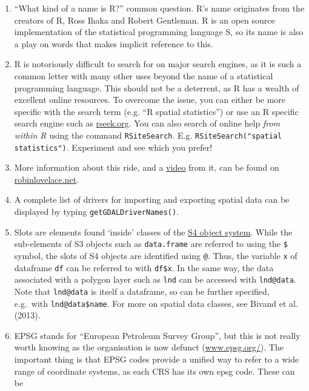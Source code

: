 \documentclass[]{article}
\begin{document}
\begin{enumerate}[1.]
\item
  ``What kind of a name is R?'' common question. R's name originates
  from the creators of R, Ross Ihaka and Robert Gentleman. R is an open
  source implementation of the statistical programming language S, so
  its name is also a play on words that makes implicit reference to
  this.
\item
  R is notoriously difficult to search for on major search engines, as
  it is such a common letter with many other uses beyond the name of a
  statistical programming language. This should not be a deterrent, as R
  has a wealth of excellent online resources. To overcome the issue, you
  can either be more specific with the search term (e.g. ``R spatial
  statistics'') or use an R specific search engine such as
  \href{http://www.rseek.org/}{rseek.org}. You can also search of online
  help \emph{from within R} using the command \texttt{RSiteSearch}. E.g.
  \texttt{RSiteSearch("spatial statistics")}. Experiment and see which
  you prefer!
\item
  More information about this ride, and a
  \href{http://www.youtube.com/watch?v=6a8QLiC4LV8\&feature=share}{video}
  from it, can be found on
  \href{http://robinlovelace.net/ecotech/2013/10/13/bicycle-trailer-move.html}{robinlovelace.net}.
\item
  A complete list of drivers for importing and exporting spatial data
  can be displayed by typing \texttt{getGDALDriverNames()}.
\item
  Slots are elements found `inside' classes of the
  \href{http://adv-r.had.co.nz/S4.html}{S4 object system}. While the
  sub-elements of S3 objects such as \texttt{data.frame} are referred to
  using the \texttt{\$} symbol, the slots of S4 objects are identified
  using \texttt{@}. Thus, the variable \texttt{x} of dataframe
  \texttt{df} can be referred to with \texttt{df\$x}. In the same way,
  the data associated with a polygon layer such as \texttt{lnd} can be
  accessed with \texttt{lnd@data}. Note that \texttt{lnd@data} is itself
  a dataframe, so can be further specified, e.g.~with
  \texttt{lnd@data\$name}. For more on spatial data classes, see Bivand
  et al. (2013).
\item
  EPSG stands for ``European Petroleum Survey Group'', but this is not
  really worth knowing as the organisation is now defunct
  (\href{http://www.epsg.org/}{www.epsg.org/}). The important thing is
  that EPSG codes provide a unified way to refer to a wide range of
  coordinate systems, as each CRS has its own epsg code. These can be

\end{enumerate}
\end{document}
